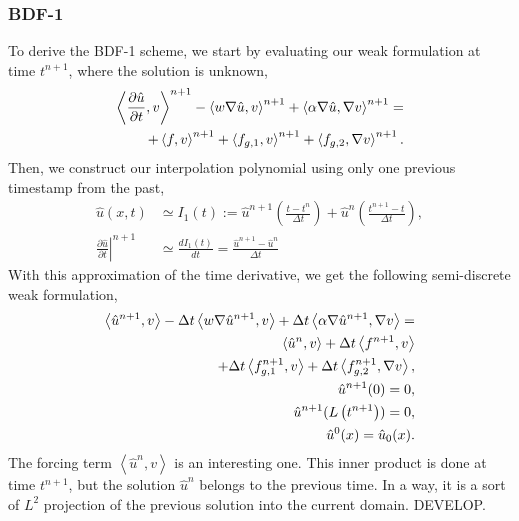 \documentclass[../main.tex]{subfiles}
\newcommand{\inner}[2]{\left<#1, #2\right>}
\begin{document}
\subsubsection{BDF-1}
To derive the BDF-1 scheme, we start by evaluating our weak formulation at time $t^{n+1}$, where the solution is unknown,
\begin{equation}
    \begin{split}
        \inner{\frac{\partial \hat{u}}{\partial t}}{v}^{n+1} 
        - \inner{w \grad \hat{u}}{v}^{n+1} 
        + \inner{\alpha \grad \hat{u}}{\grad v}^{n+1} =  \\
        + \inner{f}{v}^{n+1} + \inner{f_{g,1}}{v}^{n+1} + \inner{f_{g,2}}{\grad v}^{n+1}.
    \end{split}
\end{equation}
Then, we construct our interpolation polynomial using only one previous timestamp from the past, 
\begin{align}
    \hat{u}(x,t) &\simeq I_1(t) := 
    \hat{u}^{n+1}\left( \frac{t-t^{n}}{\Delta t}  \right)
    + \hat{u}^{n}\left(\frac{t^{n+1}-t}{\Delta t}\right), \\
    \left.\frac{\partial\hat{u}}{\partial t}\right|^{n+1} &\simeq \frac{d I_1(t)}{dt} = \frac{\hat{u}^{n+1} - \hat{u}^{n}}{\Delta t}
\end{align}
With this approximation of the time derivative, we get the following semi-discrete weak formulation, 
\begin{subequations}
    \begin{align}
        \label{eq:1d_fom_weak_formulation_semidiscrete_time}
        \inner{\hat{u}^{n+1}}{v} 
        - \Delta t \inner{w \grad \hat{u}^{n+1}}{v} 
        + \Delta t \inner{\alpha \grad \hat{u}^{n+1}}{\grad v} = \nonumber \\ 
        \inner{\hat{u}^{n}}{v} 
        + \Delta t \inner{f^{n+1}}{v} \nonumber \\
        + \Delta t \inner{f_{g,1}^{n+1}}{v} + \Delta t \inner{f_{g,2}^{n+1}}{\grad v}, \\
        \hat{u}^{n+1}(0) = 0, \\
        \hat{u}^{n+1}(L\left(t^{n+1}\right)) = 0, \\
        \hat{u}^{0}(x) = \hat{u}_0(x).
    \end{align}
\end{subequations}
The forcing term $\inner{\hat{u}^{n}}{v}$ is an interesting one.
This inner product is done at time $t^{n+1}$, but the solution $\hat{u}^{n}$ belongs to the previous time. 
In a way, it is a sort of $L^2$ projection of the previous solution into the current domain.
DEVELOP. 
\end{document}
